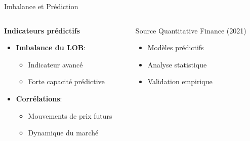 \documentclass[aspectratio=169]{beamer}  %
\begin{document}
\begin{frame}{Imbalance et Prédiction}
    \begin{columns}
        \begin{column}{0.6\textwidth}
            \textbf{Indicateurs prédictifs}
            \begin{itemize}
                \item \textbf{Imbalance du LOB}:
                \begin{itemize}
                    \item Indicateur avancé
                    \item Forte capacité prédictive
                \end{itemize}
                \item \textbf{Corrélations}:
                \begin{itemize}
                    \item Mouvements de prix futurs
                    \item Dynamique du marché
                \end{itemize}
            \end{itemize}
        \end{column}
        \begin{column}{0.4\textwidth}
            \begin{alertblock}{Source}
                \small{Quantitative Finance (2021)}
                \begin{itemize}
                    \item Modèles prédictifs
                    \item Analyse statistique
                    \item Validation empirique
                \end{itemize}
            \end{alertblock}
        \end{column}
    \end{columns}
\end{frame}
\end{document}
